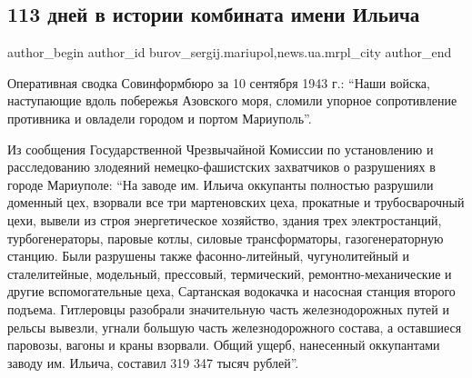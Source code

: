  
 
 
 
 
 
\subsection{113 дней в истории комбината имени Ильича}
\label{sec:16_02_2017.stz.news.ua.mrpl_city.1.113_dnej_v_istorii_kombinata_imeni_iljicha}
 
\ifcmt
 author_begin
   author_id burov_sergij.mariupol,news.ua.mrpl_city
 author_end
\fi

Оперативная сводка Совинформбюро за 10 сентября 1943 г.: \enquote{Наши войска,
наступающие вдоль побережья Азовского моря, сломили упорное сопротивление
противника и овладели городом и портом Мариуполь}.


Из сообщения Государственной Чрезвычайной Комиссии по установлению и
расследованию злодеяний немецко-фашистских захватчиков о разрушениях в городе
Мариуполе: \enquote{На заводе им. Ильича оккупанты полностью разрушили доменный цех,
взорвали все три мартеновских цеха, прокатные и трубосварочный цехи, вывели из
строя энергетическое хозяйство, здания трех электростанций, турбогенераторы,
паровые котлы, сило­вые трансформаторы, газогенераторную станцию. Были
разрушены также фасонно-литейный, чугунолитейный и сталелитейные, модельный,
прессовый, термический, ремонтно-механические и другие вспомогательные цеха,
Сартанская водокачка и насосная станция второго подъема. Гитлеровцы разобрали
значительную часть железнодорожных путей и рельсы вывезли, угнали большую
часть железнодорожного состава, а оставшиеся паровозы, вагоны и краны
взорвали. Общий ущерб, нанесенный оккупантами заводу им. Ильича, составил 319
347 тысяч рублей}.


